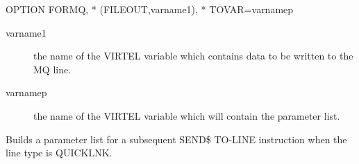 \documentclass[letterpaper,10pt,english]{sphinxmanual}
\begin{document}
\begin{sphinxVerbatim}[commandchars=\\\{\}]
OPTION\PYGZdl{} FOR\PYGZhy{}MQ,                   *
    (FILE\PYGZhy{}OUT,\PYGZsq{}varname1\PYGZsq{}),        *
    TOVAR=\PYGZsq{}varnamep\PYGZsq{}
\end{sphinxVerbatim}
\begin{description}
\item[{varname1}] \leavevmode
the name of the VIRTEL variable which contains data to be written to the MQ line.

\item[{varnamep}] \leavevmode
the name of the VIRTEL variable which will contain the parameter list.

\end{description}


Builds a parameter list for a subsequent SEND\$ TO-LINE instruction when the line type is QUICKLNK.
\end{document}
